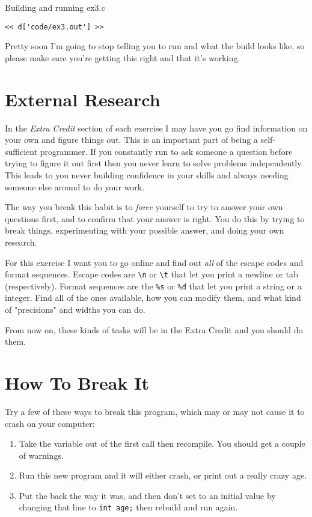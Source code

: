 \begin{Terminal}{Building and running ex3.c}
\begin{lstlisting}
<< d['code/ex3.out'] >>
\end{lstlisting}
\end{Terminal}

Pretty soon I'm going to stop telling you to run  and what
the build looks like, so please make sure you're getting this right
and that it's working.

\section{External Research}

In the \emph{Extra Credit} section of each exercise I may have you go
find information on your own and figure things out.  This is an important
part of being a self-sufficient programmer.  If you constantly run to
ask someone a question before trying to figure it out first then you
never learn to solve problems independently.  This leads to you never
building confidence in your skills and always needing someone else
around to do your work.

The way you break this habit is to \emph{force} yourself to try to answer
your own questions first, and to confirm that your answer is right.  You
do this by trying to break things, experimenting with your possible answer,
and doing your own research.

For this exercise I want you to go online and find out \emph{all} of the
 escape codes and format sequences.  Escape codes are 
\verb|\n| or \verb|\t| that let you print a newline or tab (respectively).
Format sequences are the \verb|%s| or \verb|%d| that let you print a 
string or a integer.  Find all of the ones available, how you can
modify them, and what kind of "precisions" and widths you can do.

From now on, these kinds of tasks will be in the Extra Credit and you
should do them.

\section{How To Break It}

Try a few of these ways to break this program, which may or may
not cause it to crash on your computer:

\begin{enumerate}
\item Take the  variable out of the first  call
    then recompile. You should get a couple of warnings.
\item Run this new program and it will either crash, or print out a really
    crazy age.
\item Put the  back the way it was, and then don't set 
    to an initial value by changing that line to \verb|int age;| then
    rebuild and run again.
\end{enumerate}


